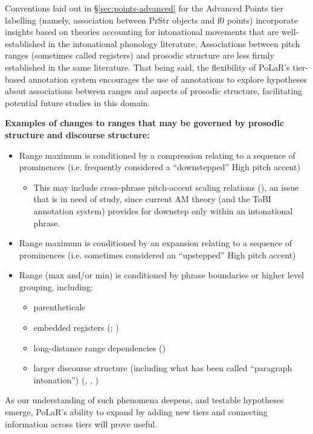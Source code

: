 \documentclass[11pt, twoside]{memoir}
\begin{document}
Conventions laid out in §\ref{sec:points-advanced} for the Advanced Points tier labelling (namely, association between PrStr objects and f0 points) incorporate insights based on theories accounting for intonational movements that are well-established in the intonational phonology literature. Associations between pitch ranges (sometimes called registers) and prosodic structure are less firmly established in the same literature. That being said, the flexibility of PoLaR’s tier-based annotation system encourages the use of annotations to explore hypotheses about associations between ranges and aspects of prosodic structure, facilitating potential future studies in this domain. 

\textbf{Examples of changes to ranges that may be governed by prosodic structure and discourse structure:}
\begin{itemize}
	\item Range maximum is conditioned by a compression relating to a sequence of prominences (i.e. frequently considered a “downstepped” High pitch accent) 
	\begin{itemize}
		\item This may include cross-phrase pitch-accent scaling relations (\citealt{fery-05}), an issue that is in need of study, since current AM theory (and the ToBI annotation system) provides for downstep only within an intonational phrase. 
	\end{itemize}
	\item Range maximum is conditioned by an expansion relating to a sequence of prominences (i.e. sometimes considered an “upstepped” High pitch accent) 
	\item Range (max and/or min) is conditioned by phrase boundaries or higher level grouping, including:
	\begin{itemize}
		\item parentheticals
		\item embedded registers (\citealt{truckenbrodt02}; \citealt{dimperio-10})
		\item long-distance range dependencies (\citealt{ladd88})
		\item larger discourse structure (including what has been called “paragraph intonation”) (\citealt{lehiste75}, \citealt{sluijter-93}, \citealt{wichmann14})
	\end{itemize}
\end{itemize}

As our understanding of such phenomena deepens, and testable hypotheses emerge, PoLaR’s ability to expand by adding new tiers and connecting information across tiers will prove useful.
\end{document}
